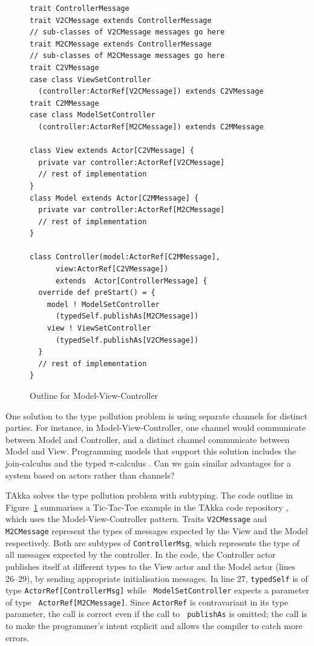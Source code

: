 \begin{figure}[h]
\label{MVC}
\begin{lstlisting}
trait ControllerMessage
trait V2CMessage extends ControllerMessage
// sub-classes of V2CMessage messages go here
trait M2CMessage extends ControllerMessage
// sub-classes of M2CMessage messages go here
trait C2VMessage
case class ViewSetController
  (controller:ActorRef[V2CMessage]) extends C2VMessage
trait C2MMessage
case class ModelSetController
  (controller:ActorRef[M2CMessage]) extends C2MMessage

class View extends Actor[C2VMessage] {
  private var controller:ActorRef[V2CMessage]
  // rest of implementation
}
class Model extends Actor[C2MMessage] {
  private var controller:ActorRef[M2CMessage]
  // rest of implementation
}

class Controller(model:ActorRef[C2MMessage], 
      view:ActorRef[C2VMessage]) 
      extends  Actor[ControllerMessage] {
  override def preStart() = {
    model ! ModelSetController
      (typedSelf.publishAs[M2CMessage])
    view ! ViewSetController
      (typedSelf.publishAs[V2CMessage])
  }
  // rest of implementation
}
\end{lstlisting}
\caption{Outline for Model-View-Controller}
\vspace{-15pt}
\end{figure}




One solution to the type pollution problem is using separate channels
for distinct parties.  For instance, in Model-View-Controller, one
channel would communicate between Model and Controller, and a distinct
channel communicate between Model and View.  Programming models that
support this solution includes the join-calculus \citep{full_join} and
the typed $\pi$-calculus \citep{pi_book}.  Can we gain similar
advantages for a system based on actors rather than channels?

TAkka solves the type pollution problem with subtyping.  The code
outline in Figure~\ref{MVC} summarises a Tic-Tac-Toe example in the
TAkka code repository \cite{takka_repo}, which uses the
Model-View-Controller pattern.  Traits {\tt V2CMessage} and {\tt
  M2CMessage} represent the types of messages expected by the View and
the Model respectively.  Both are subtypes of {\tt ControllerMsg},
which represents the type of all messages expected by the controller.
In the code, the Controller actor publishes itself at different types
to the View actor and the Model actor (lines 26--29), by sending
appropriate initialisation messages.  In line 27, {\tt typedSelf}
is of type {\tt ActorRef[ControllerMsg]} while {\tt
  ModelSetController} expects a parameter of type {\tt
  ActorRef[M2CMessage]}. Since {\tt ActorRef} is contravariant in its
type parameter, the call is correct even if the call to {\tt
  publishAs} is omitted; the call is to make the programmer's intent
explicit and allows the compiler to catch more errors.


